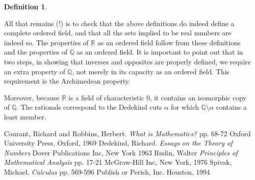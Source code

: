 \documentclass[12pt]{article}
\theoremstyle{definition}
\newtheorem*{defn}{Definition}
\theoremstyle{definition}
\theoremstyle{definition}
\newcommand{\RR}{\mathbb{R}}
\newcommand{\QQ}{\mathbb{Q}}
\begin{document}
\begin{defn}
\begin{itemize}
\end{itemize}
\end{defn}

All that remains (!) is to check that the above definitions do indeed define a complete ordered field, and that
all the sets implied to be real numbers are indeed so.  
The properties of $\RR$ as an ordered field follow from these definitions and the properties of $\QQ$ as an
 ordered field. 
It is important to point out that in two steps, in showing that inverses and opposites are properly defined, 
we require an extra property of $\QQ$, not merely in its capacity as an ordered field.
This requirement is the Archimedean property.

Moreover, because $\RR$ is a field of characteristic $0$, it contains an isomorphic copy of $\QQ$.  The rationals
correspond to the Dedekind cuts $\alpha$ for which $\QQ \setminus \alpha$ contains a least member.

\begin{thebibliography}{99}
Courant, Richard and Robbins, Herbert.  {\it What is Mathematics?} pp. 68-72  Oxford University Press, Oxford, 1969
Dedekind, Richard.  {\it Essays on the Theory of Numbers}  Dover Publications Inc, New York 1963
Rudin, Walter {\it Principles of Mathematical Analysis} pp. 17-21 McGraw-Hill Inc, New York, 1976
Spivak, Michael.  {\it Calculus} pp. 569-596  Publish or Perish, Inc. Houston, 1994

\end{thebibliography}
\end{document}
